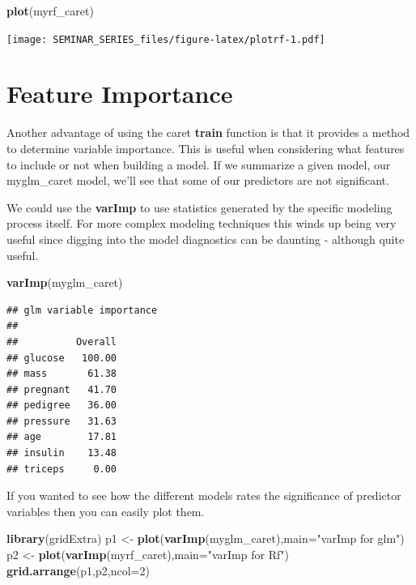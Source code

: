 \documentclass[]{book}
\newenvironment{Shaded}{\begin{snugshade}}{\end{snugshade}}
\newcommand{\KeywordTok}[1]{\textcolor[rgb]{0.13,0.29,0.53}{\textbf{#1}}}
\newcommand{\DataTypeTok}[1]{\textcolor[rgb]{0.13,0.29,0.53}{#1}}
\newcommand{\DecValTok}[1]{\textcolor[rgb]{0.00,0.00,0.81}{#1}}
\newcommand{\StringTok}[1]{\textcolor[rgb]{0.31,0.60,0.02}{#1}}
\newcommand{\NormalTok}[1]{#1}
\begin{document}
\begin{Shaded}
\begin{Highlighting}[]
\KeywordTok{plot}\NormalTok{(myrf_caret)}
\end{Highlighting}
\end{Shaded}

\texttt{[image: SEMINAR\_SERIES\_files/figure-latex/plotrf-1.pdf]}

\chapter{Feature Importance}\label{feature-importance}

Another advantage of using the caret \textbf{train} function is that it
provides a method to determine variable importance. This is useful when
considering what features to include or not when building a model. If we
summarize a given model, our myglm\_caret model, we'll see that some of
our predictors are not significant.

We could use the \textbf{varImp} to use statistics generated by the
specific modeling process itself. For more complex modeling techniques
this winds up being very useful since digging into the model diagnostics
can be daunting - although quite useful.

\begin{Shaded}
\begin{Highlighting}[]
\KeywordTok{varImp}\NormalTok{(myglm_caret)}
\end{Highlighting}
\end{Shaded}

\begin{verbatim}
## glm variable importance
## 
##          Overall
## glucose   100.00
## mass       61.38
## pregnant   41.70
## pedigree   36.00
## pressure   31.63
## age        17.81
## insulin    13.48
## triceps     0.00
\end{verbatim}

If you wanted to see how the different models rates the significance of
predictor variables then you can easily plot them.

\begin{Shaded}
\begin{Highlighting}[]
\KeywordTok{library}\NormalTok{(gridExtra)}
\NormalTok{p1 <-}\StringTok{ }\KeywordTok{plot}\NormalTok{(}\KeywordTok{varImp}\NormalTok{(myglm_caret),}\DataTypeTok{main=}\StringTok{"varImp for glm"}\NormalTok{)}
\NormalTok{p2 <-}\StringTok{ }\KeywordTok{plot}\NormalTok{(}\KeywordTok{varImp}\NormalTok{(myrf_caret),}\DataTypeTok{main=}\StringTok{"varImp for Rf"}\NormalTok{)}
\KeywordTok{grid.arrange}\NormalTok{(p1,p2,}\DataTypeTok{ncol=}\DecValTok{2}\NormalTok{)}
\end{Highlighting}
\end{Shaded}
\end{document}
